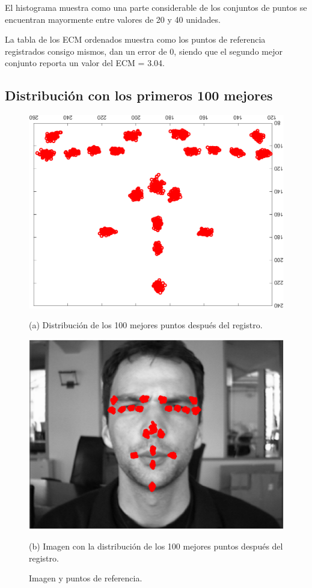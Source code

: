 \documentclass[11pt, letterpaper]{article}
\begin{document}
El histograma muestra como una parte considerable de los conjuntos de puntos se encuentran mayormente entre valores de 20 y 40 unidades. 

La tabla de los ECM ordenados muestra como los puntos de referencia registrados consigo mismos, dan un error de 0, siendo que el segundo mejor conjunto reporta un valor del ECM = 3.04.


\newpage

\subsection{Distribución con los primeros 100 mejores}

\begin{figure}[h!]
	\centering
	\begin{minipage}{0.4\textwidth}
		\centering
		\includegraphics[width=\textwidth]{IMG/R7.png}
		\caption*{(a) Distribución de los 100 mejores puntos después del registro.}
	\end{minipage}\hfill
	\begin{minipage}{0.4\textwidth}
		\centering
		\includegraphics[width=\textwidth]{IMG/R8.png}
		\caption*{(b) Imagen con la distribución de los 100 mejores puntos después del registro.}
	\end{minipage}
	\caption{Imagen y puntos de referencia.}
	\label{fig:f5}
\end{figure}
\end{document}
